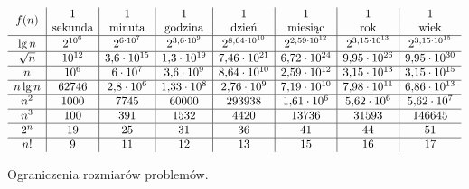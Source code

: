 \begin{table}[ht]
	\begin{center}
		\[
			\begin{array}{c|c|c|c|c|c|c|c}
				&1&1&1&1&1&1&1 \\
				\raisebox{1.5ex}[0cm][0cm]{$f(n)$} & \text{sekunda} & \text{minuta} & \text{godzina} & \text{dzień} & \text{miesiąc} & \text{rok} & \text{wiek} \\
				\hline
				\lg n & 2^{10^6} & 2^{6\cdot10^7} & 2^{3{,}6\cdot10^9} & 2^{8{,}64\cdot10^{10}} & 2^{2{,}59\cdot10^{12}} & 2^{3{,}15\cdot10^{13}} & 2^{3{,}15\cdot10^{15}} \\
				\hline
				\sqrt{n} & 10^{12} & 3{,}6\cdot10^{15} & 1{,}3\cdot10^{19} & 7{,}46\cdot10^{21} & 6{,}72\cdot10^{24} & 9{,}95\cdot10^{26} & 9{,}95\cdot10^{30} \\
				\hline
				n & 10^6 & 6\cdot10^7 & 3{,}6\cdot10^9 & 8{,}64\cdot10^{10} & 2{,}59\cdot10^{12} & 3{,}15\cdot10^{13} & 3{,}15\cdot10^{15} \\
				\hline
				n\lg n & 62746 & 2{,}8\cdot10^6 & 1{,}33\cdot10^8 & 2{,}76\cdot10^9 & 7{,}19\cdot10^{10} & 7{,}98\cdot10^{11} & 6{,}86\cdot10^{13} \\
				\hline
				n^2 & 1000 & 7745 & 60000 & 293938 & 1{,}61\cdot10^6 & 5{,}62\cdot10^6 & 5{,}62\cdot10^7 \\
				\hline
				n^3 & 100 & 391 & 1532 & 4420 & 13736 & 31593 & 146645 \\
				\hline
				2^n & 19 & 25 & 31 & 36 & 41 & 44 & 51 \\
				\hline
				n! & 9 & 11 & 12 & 13 & 15 & 16 & 17
			\end{array}
		\]
	\end{center}
	\caption{Ograniczenia rozmiarów problemów.} \label{tab:1-1}
\end{table}

\endinput